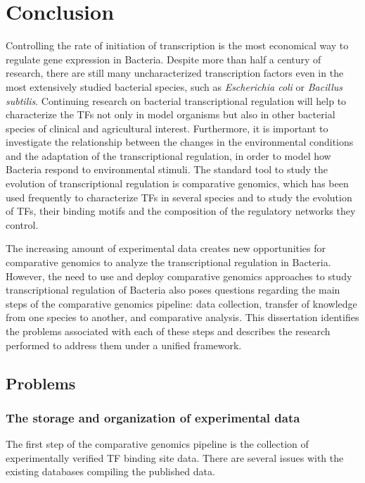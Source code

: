 
\chapter{Conclusion}

Controlling the rate of initiation of transcription is the most economical way
to regulate gene expression in Bacteria. Despite more than half a century of
research, there are still many uncharacterized transcription factors even in
the most extensively studied bacterial species, such as \textit{Escherichia
  coli} or \textit{Bacillus subtilis}. Continuing research on bacterial
transcriptional regulation will help to characterize the TFs not only in model
organisms but also in other bacterial species of clinical and agricultural
interest. Furthermore, it is important to investigate the relationship between the
changes in the environmental conditions and the adaptation of the
transcriptional regulation, in order to model how Bacteria respond to
environmental stimuli. The standard tool to study the evolution of
transcriptional regulation is comparative genomics, which has been used
frequently to characterize TFs in several species and to study the evolution of
TFs, their binding motifs and the composition of the regulatory networks they control.

The increasing amount of experimental data creates new opportunities for
comparative genomics to analyze the transcriptional regulation in
Bacteria. However, the need to use and deploy comparative genomics approaches
to study transcriptional regulation of Bacteria also poses questions regarding
the main steps of the comparative genomics pipeline: data collection, transfer
of knowledge from one species to another, and comparative analysis. This
dissertation identifies the problems associated with each of these steps and
describes the research performed to address them under a unified framework.

\section{Problems}

\subsection{The storage and organization of experimental data}

The first step of the comparative genomics pipeline is the collection of
experimentally verified TF binding site data. There are several issues with the
existing databases compiling the published data.

